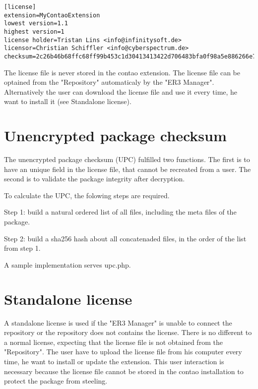 \begin{lstlisting}[caption=License file]
[license]
extension=MyContaoExtension
lowest version=1.1
highest version=1
license holder=Tristan Lins <info@infinitysoft.de>
licensor=Christian Schiffler <info@cyberspectrum.de>
checksum=2c26b46b68ffc68ff99b453c1d30413413422d706483bfa0f98a5e886266e7ae
\end{lstlisting}

The license file is never stored in the contao extension. The license file can be optained from the "Repository" automaticaly by the "ER3 Manager". Alternatively the user can download the license file and use it every time, he want to install it (see Standalone license).

\section[sec:unencrypted package checksum]{Unencrypted package checksum}

The unencrypted package checksum (UPC) fulfilled two functions.
The first is to have an unique field in the license file, that cannot be recreated from a user.
The second is to validate the package integrity after decryption.

To calculate the UPC, the folowing steps are required.

Step 1: build a natural ordered list of all files, including the meta files of the package.

Step 2: build a sha256 hash about all concatenaded files, in the order of the list from step 1.

A sample implementation serves upc.php.

\section[sec:standalone license]{Standalone license}

A standalone license is used if the "ER3 Manager" is unable to connect the repository or the repository does not contains the license. There is no different to a normal license, expecting that the license file is not obtained from the "Repository". The user have to upload the license file from his computer every time, he want to install or update the extension. This user interaction is necessary because the license file cannot be stored in the contao installation to protect the package from steeling.

